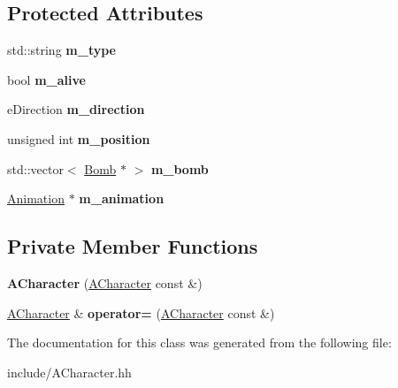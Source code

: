 \subsection*{Protected Attributes}
\begin{DoxyCompactItemize}
\item 
\hypertarget{class_a_character_a4da0a34af9850b10696f82df9009c5e9}{}std\+::string {\bfseries m\+\_\+type}\label{class_a_character_a4da0a34af9850b10696f82df9009c5e9}

\item 
\hypertarget{class_a_character_a4083c1a5cf5b800b6a4662f4af7755c6}{}bool {\bfseries m\+\_\+alive}\label{class_a_character_a4083c1a5cf5b800b6a4662f4af7755c6}

\item 
\hypertarget{class_a_character_af89bbca149791a99c7a1daa776be5526}{}e\+Direction {\bfseries m\+\_\+direction}\label{class_a_character_af89bbca149791a99c7a1daa776be5526}

\item 
\hypertarget{class_a_character_adb37a22112116dc8b3cf1da18c94c370}{}unsigned int {\bfseries m\+\_\+position}\label{class_a_character_adb37a22112116dc8b3cf1da18c94c370}

\item 
\hypertarget{class_a_character_a6a4d6f761fe96d339e8eb172d6528927}{}std\+::vector$<$ \hyperlink{class_bomb}{Bomb} $\ast$ $>$ {\bfseries m\+\_\+bomb}\label{class_a_character_a6a4d6f761fe96d339e8eb172d6528927}

\item 
\hypertarget{class_a_character_ad840248b206c5d654c2ff66f00e7fe1d}{}\hyperlink{class_animation}{Animation} $\ast$ {\bfseries m\+\_\+animation}\label{class_a_character_ad840248b206c5d654c2ff66f00e7fe1d}

\end{DoxyCompactItemize}
\subsection*{Private Member Functions}
\begin{DoxyCompactItemize}
\item 
\hypertarget{class_a_character_abc98df2ccf043a87dcb2ca18920a8676}{}{\bfseries A\+Character} (\hyperlink{class_a_character}{A\+Character} const \&)\label{class_a_character_abc98df2ccf043a87dcb2ca18920a8676}

\item 
\hypertarget{class_a_character_a32bb31f0c3adf6ffa69704a8d0f20ccb}{}\hyperlink{class_a_character}{A\+Character} \& {\bfseries operator=} (\hyperlink{class_a_character}{A\+Character} const \&)\label{class_a_character_a32bb31f0c3adf6ffa69704a8d0f20ccb}

\end{DoxyCompactItemize}


The documentation for this class was generated from the following file\+:\begin{DoxyCompactItemize}
\item 
include/A\+Character.\+hh\end{DoxyCompactItemize}
